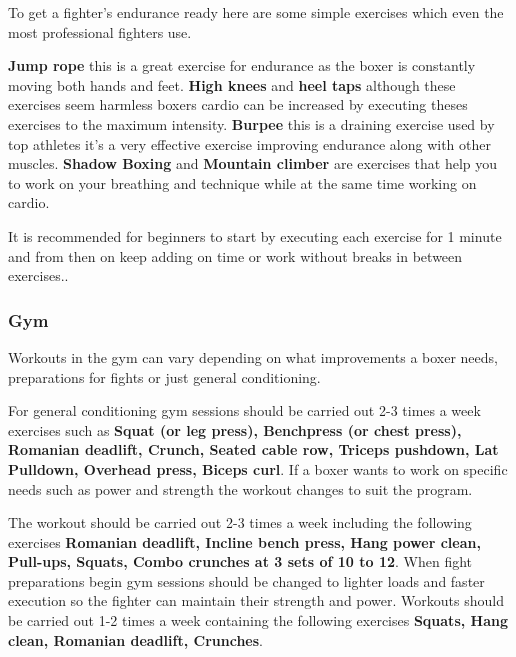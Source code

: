\documentclass[a4paper,12pt]{report}
\begin{document}
To get a fighter's endurance ready here are some simple exercises which even the most professional fighters use.

\textbf{Jump rope} this is a great exercise for endurance as the boxer is constantly moving both hands and feet. \textbf{High knees} and \textbf{heel taps} although these exercises seem harmless boxers cardio can be increased by executing theses exercises to the maximum intensity. \textbf{Burpee} this is a draining exercise used by top athletes it's a very effective exercise improving endurance along with other muscles. \textbf{Shadow Boxing} and \textbf{Mountain climber} are exercises that help you to work on your breathing and technique while at the same time working on cardio.

It is recommended for beginners to start by executing each exercise for 1 minute and from then on keep adding on time or work without breaks in between exercises.\cite{cardioWorkout}.\\

\subsubsection{Gym}
Workouts in the gym can vary depending on what improvements a boxer needs, preparations for fights or just general conditioning.

For general conditioning gym sessions should be carried out 2-3 times a week exercises such as \textbf{Squat (or leg press), Benchpress (or chest press), Romanian deadlift, Crunch, Seated cable row, Triceps pushdown, Lat Pulldown, Overhead press, Biceps curl}. If a boxer wants to work on specific needs such as power and strength the workout changes to suit the program.

The workout should be carried out 2-3 times a week including the following exercises \textbf{Romanian deadlift, Incline bench press, Hang power clean, Pull-ups, Squats, Combo crunches at 3 sets of 10 to 12}. When fight preparations begin gym sessions should be changed to lighter loads and faster execution so the fighter can maintain their strength and power.
Workouts should be carried out 1-2 times a week containing the following exercises \textbf{Squats, Hang clean, Romanian deadlift, Crunches}.\cite{gymWorkout}
\end{document}
